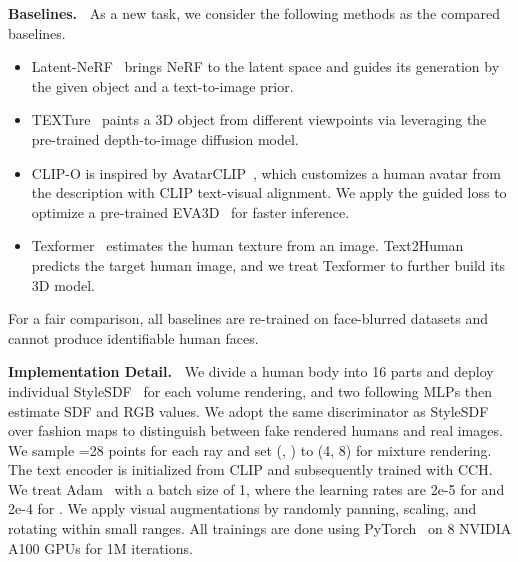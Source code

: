 \documentclass[11pt]{article}
\begin{document}
\vspace{1ex} \noindent \textbf{Baselines.~}
As a new task, we consider the following methods as the compared baselines.
\begin{itemize}[noitemsep, leftmargin=*, topsep=1pt]
    \item Latent-NeRF~\cite{metzer2023latent-nerf} brings NeRF to the latent space and guides its generation by the given object and a text-to-image prior.
    \item TEXTure~\cite{richardson2023texture} paints a 3D object from different viewpoints via leveraging the pre-trained depth-to-image diffusion model. 
    \item CLIP-O is inspired by AvatarCLIP~\cite{hong2022avatar-clip}, which customizes a human avatar from the description with CLIP text-visual alignment. We apply the guided loss to optimize a pre-trained EVA3D~\cite{hong2023eva3d} for faster inference.
    \item Texformer~\cite{xu2021texformer} estimates the human texture from an image. Text2Human~\cite{jiang2022text2human} predicts the target human image, and we treat Texformer to further build its 3D model.
\end{itemize}
For a fair comparison, all baselines are re-trained on face-blurred datasets and cannot produce identifiable human faces.

\vspace{1ex} \noindent \textbf{Implementation Detail.~}
We divide a human body into 16 parts and deploy individual StyleSDF~\cite{or-ei2022style-sdf} for each volume rendering, and two following MLPs then estimate SDF and RGB values. We adopt the same discriminator as StyleSDF over fashion maps to distinguish between fake rendered humans and real images. We sample =28 points for each ray and set (, ) to (4, 8) for mixture rendering. The text encoder is initialized from CLIP and subsequently trained with CCH. We treat Adam~\cite{kingma2015adam} with a batch size of 1, where the learning rates are 2e-5 for  and 2e-4 for . We apply visual augmentations by randomly panning, scaling, and rotating within small ranges. All trainings are done using PyTorch~\cite{paszke2017pytorch} on 8 NVIDIA A100 GPUs for 1M iterations.
\end{document}
